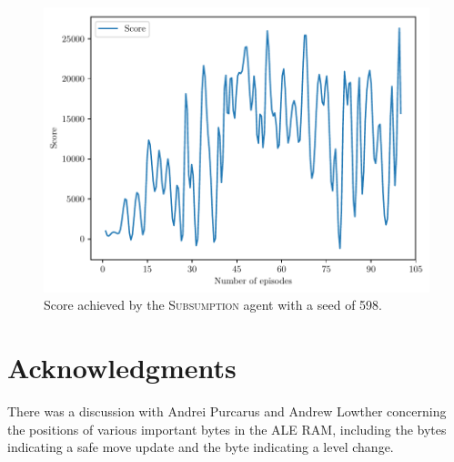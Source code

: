 \documentclass[a4paper,titlepage]{article}
\begin{document}
	\begin{figure}[!htb]
		\centering
		\includegraphics[width=\columnwidth]{plots/seed598.pdf}
		\caption
		{Score achieved by the \textsc{Subsumption} agent with a seed of 598.}
		\label{fig:seed598}
	\end{figure}
	\section*{Acknowledgments}
	
	There was a discussion with Andrei Purcarus and Andrew Lowther concerning the positions of various important bytes in the ALE RAM, including the bytes indicating a safe move update and the byte indicating a level change.
	
	
	
	{}
	
\end{document}
